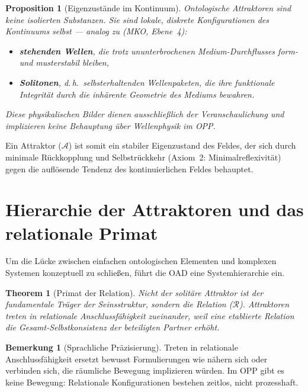 \documentclass[11pt,a4paper]{article}
\theoremstyle{plain}
\newtheorem{theorem}{Theorem}[section]
\newtheorem{proposition}{Proposition}[section]
\theoremstyle{definition}
\newtheorem{remark}{Bemerkung}[section]
\begin{document}
\begin{proposition}[Eigenzust\"{a}nde im Kontinuum]
Ontologische Attraktoren sind keine isolierten Substanzen. Sie sind lokale, diskrete
Konfigurationen des Kontinuums selbst --- \emph{analog zu} (MKO, Ebene~4):
\begin{itemize}
  \item \textbf{stehenden Wellen}, die trotz ununterbrochenen Medium-Durchflusses
        form- und musterstabil bleiben,
  \item \textbf{Solitonen}, d.\,h.\ selbsterhaltenden Wellenpaketen, die ihre
        funktionale Integrit\"{a}t durch die inh\"{a}rente Geometrie des Mediums
        bewahren.
\end{itemize}
Diese physikalischen Bilder dienen ausschlie\ss{}lich der Veranschaulichung und
implizieren keine Behauptung \"{u}ber Wellenphysik im OPP.
\end{proposition}

Ein Attraktor ($\mathcal{A}$) ist somit ein stabiler Eigenzustand des Feldes, der sich
durch minimale R\"{u}ckkopplung und Selbstr\"{u}ckkehr (Axiom~2: Minimalreflexivit\"{a}t)
gegen die aufl\"{o}sende Tendenz des kontinuierlichen Feldes behauptet.

\section{Hierarchie der Attraktoren und das relationale Primat}

Um die L\"{u}cke zwischen einfachen ontologischen Elementen und komplexen Systemen
konzeptuell zu schlie\ss{}en, f\"{u}hrt die OAD eine Systemhierarchie ein.

\begin{theorem}[Primat der Relation]
Nicht der solit\"{a}re Attraktor ist der fundamentale Tr\"{a}ger der Seinsstruktur,
sondern die \emph{Relation} ($\mathcal{R}$). Attraktoren treten in relationale
Anschlussf\"{a}higkeit zueinander, weil eine etablierte Relation die Gesamt-Selbstkonsistenz
der beteiligten Partner erh\"{o}ht.
\end{theorem}

\begin{remark}[Sprachliche Pr\"{a}zisierung]
\glqq{}Treten in relationale Anschlussf\"{a}higkeit\grqq{} ersetzt bewusst Formulierungen
wie \glqq{}n\"{a}hern sich\grqq{} oder \glqq{}verbinden sich\grqq{}, die r\"{a}umliche
Bewegung implizieren w\"{u}rden. Im OPP gibt es keine Bewegung: Relationale
Konfigurationen bestehen zeitlos, nicht prozesshaft.
\end{remark}
\end{document}
